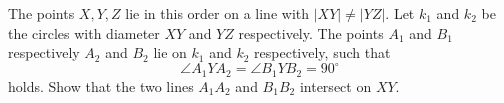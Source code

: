 The points $X,Y,Z$ lie in this order on a line with $|XY| \neq |YZ|$. Let $k_1$ and $k_2$ be
the circles with diameter $XY$ and $YZ$ respectively. The points $A_1$ and $B_1$ respectively
$A_2$ and $B_2$ lie on $k_1$ and $k_2$ respectively, such that
$$\angle A_1YA_2 = \angle B_1YB_2 = 90^\circ$$
holds. Show that the two lines $A_1A_2$ and $B_1B_2$ intersect on $XY$.